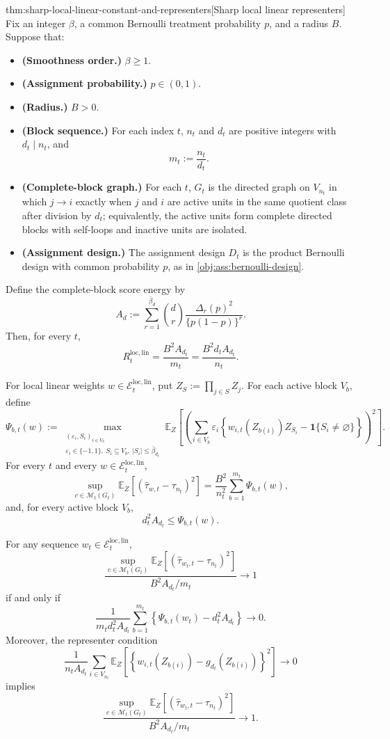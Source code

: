 \documentclass[11pt]{article}
\begin{document}
\begin{theoremv}{thm:sharp-local-linear-constant-and-representers}[Sharp local linear representers]
Fix an integer \(\beta\), a common Bernoulli treatment probability \(p\), and a radius \(B\).  Suppose that:
\begin{itemize}
\item \textbf{(Smoothness order.)} \(\beta\ge 1\).
\item \textbf{(Assignment probability.)} \(p\in(0,1)\).
\item \textbf{(Radius.)} \(B>0\).
\item \textbf{(Block sequence.)} For each index \(t\), \(n_t\) and \(d_t\) are positive integers with \(d_t\mid n_t\), and
\[
m_t:=\frac{n_t}{d_t}.
\]
\item \textbf{(Complete-block graph.)} For each \(t\), \(G_t\) is the directed graph on \(V_{n_t}\) in which \(j\to i\) exactly when \(j\) and \(i\) are active units in the same quotient class after division by \(d_t\); equivalently, the active units form complete directed blocks with self-loops and inactive units are isolated.
\item \textbf{(Assignment design.)} The assignment design \(D_t\) is the product Bernoulli design with common probability \(p\), as in \cref{obj:ass:bernoulli-design}.
\end{itemize}
Define the complete-block score energy by
\[
A_d
:=
\sum_{r=1}^{\bar\beta_d}
\binom{d}{r}\frac{\Delta_r(p)^2}{\{p(1-p)\}^r}.
\]
Then, for every \(t\),
\[
R_t^{\mathrm{loc,lin}}
=
\frac{B^2A_{d_t}}{m_t}
=
\frac{B^2d_tA_{d_t}}{n_t}.
\]

For local linear weights \(w\in\mathcal E_t^{\mathrm{loc,lin}}\), put \(Z_S:=\prod_{j\in S}Z_j\).  For each active block \(V_b\), define
\[
\Psi_{b,t}(w)
:=
\max_{\substack{(\varepsilon_i,S_i)_{i\in V_b}\\
\varepsilon_i\in\{-1,1\},\ S_i\subseteq V_b,\ |S_i|\le \bar\beta_{d_t}}}
\mathbb E_Z\!\left[
\left(
\sum_{i\in V_b}
\varepsilon_i
\left\{
w_{i,t}(Z_{b(i)})Z_{S_i}
-
\mathbf 1\{S_i\ne\varnothing\}
\right\}
\right)^2
\right].
\]
For every \(t\) and every \(w\in\mathcal E_t^{\mathrm{loc,lin}}\),
\[
\sup_{c\in\mathcal M_t(G_t)}
\mathbb E_Z\!\left[(\widehat\tau_{w,t}-\tau_{n_t})^2\right]
=
\frac{B^2}{n_t^2}\sum_{b=1}^{m_t}\Psi_{b,t}(w),
\]
and, for every active block \(V_b\),
\[
d_t^2A_{d_t}\le \Psi_{b,t}(w).
\]

For any sequence \(w_t\in\mathcal E_t^{\mathrm{loc,lin}}\),
\[
\frac{
\sup_{c\in\mathcal M_t(G_t)}
\mathbb E_Z\!\left[(\widehat\tau_{w_t,t}-\tau_{n_t})^2\right]
}{
B^2A_{d_t}/m_t
}
\longrightarrow 1
\]
if and only if
\[
\frac{1}{m_td_t^2A_{d_t}}
\sum_{b=1}^{m_t}
\left\{\Psi_{b,t}(w_t)-d_t^2A_{d_t}\right\}
\longrightarrow 0.
\]
Moreover, the representer condition
\[
\frac{1}{n_tA_{d_t}}
\sum_{i\in V_{n_t}}
\mathbb E_Z\!\left[
\left\{
w_{i,t}(Z_{b(i)})-g_{d_t}(Z_{b(i)})
\right\}^2
\right]
\longrightarrow 0
\]
implies
\[
\frac{
\sup_{c\in\mathcal M_t(G_t)}
\mathbb E_Z\!\left[(\widehat\tau_{w_t,t}-\tau_{n_t})^2\right]
}{
B^2A_{d_t}/m_t
}
\longrightarrow 1.
\]


\end{theoremv}
\end{document}
